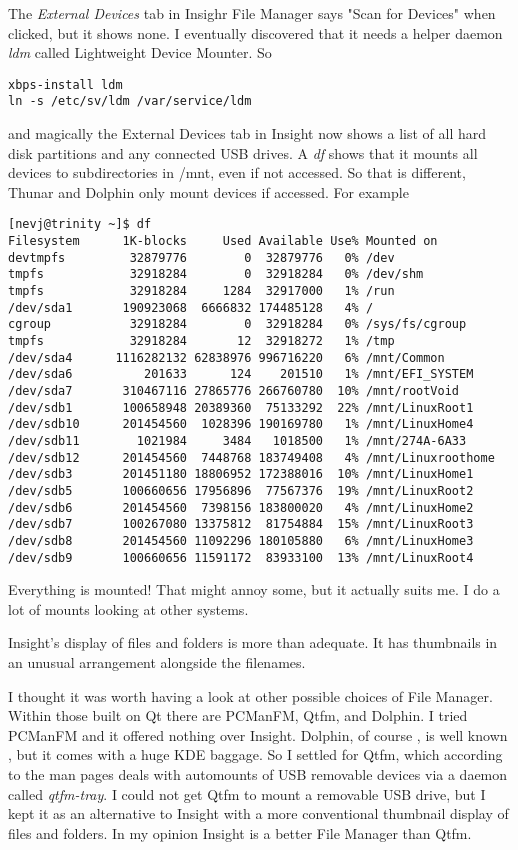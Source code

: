 \documentclass{article}  %
\begin{document}
{The {\em External Devices} tab in Insighr File Manager says "Scan for Devices" when clicked, but it shows none. I eventually discovered that it needs a helper daemon {\em ldm} called Lightweight Device Mounter. So
\begin{verbatim}
xbps-install ldm
ln -s /etc/sv/ldm /var/service/ldm
\end{verbatim}
and magically the External Devices tab in Insight now shows a list of all hard disk partitions and any connected USB drives. A {\em df} shows that it mounts all devices to subdirectories in /mnt, even if not accessed. So that is different, Thunar and Dolphin only mount devices if accessed. For example
\begin{verbatim}
[nevj@trinity ~]$ df
Filesystem      1K-blocks     Used Available Use% Mounted on
devtmpfs         32879776        0  32879776   0% /dev
tmpfs            32918284        0  32918284   0% /dev/shm
tmpfs            32918284     1284  32917000   1% /run
/dev/sda1       190923068  6666832 174485128   4% /
cgroup           32918284        0  32918284   0% /sys/fs/cgroup
tmpfs            32918284       12  32918272   1% /tmp
/dev/sda4      1116282132 62838976 996716220   6% /mnt/Common
/dev/sda6          201633      124    201510   1% /mnt/EFI_SYSTEM
/dev/sda7       310467116 27865776 266760780  10% /mnt/rootVoid
/dev/sdb1       100658948 20389360  75133292  22% /mnt/LinuxRoot1
/dev/sdb10      201454560  1028396 190169780   1% /mnt/LinuxHome4
/dev/sdb11        1021984     3484   1018500   1% /mnt/274A-6A33
/dev/sdb12      201454560  7448768 183749408   4% /mnt/Linuxroothome
/dev/sdb3       201451180 18806952 172388016  10% /mnt/LinuxHome1
/dev/sdb5       100660656 17956896  77567376  19% /mnt/LinuxRoot2
/dev/sdb6       201454560  7398156 183800020   4% /mnt/LinuxHome2
/dev/sdb7       100267080 13375812  81754884  15% /mnt/LinuxRoot3
/dev/sdb8       201454560 11092296 180105880   6% /mnt/LinuxHome3
/dev/sdb9       100660656 11591172  83933100  13% /mnt/LinuxRoot4
\end{verbatim}
Everything is mounted!  That might annoy some, but it actually suits me. I do a lot of mounts looking at other systems.

 Insight's display of files and folders is more than adequate. It has thumbnails in an unusual arrangement alongside the filenames.

I thought it was worth having a look at other possible choices of File Manager. Within those built on Qt there are PCManFM, Qtfm, and Dolphin. I tried PCManFM and it offered nothing over Insight. Dolphin, of course , is well known , but it comes with a huge KDE baggage. So I settled for Qtfm, which according to the man pages deals with automounts of USB removable devices via a daemon called {\em qtfm-tray}. I could not get Qtfm to mount a removable USB drive, but I kept it as an alternative to Insight with a more conventional thumbnail display of files and folders.  In my opinion Insight is a better File Manager than Qtfm.

}
\end{document}
